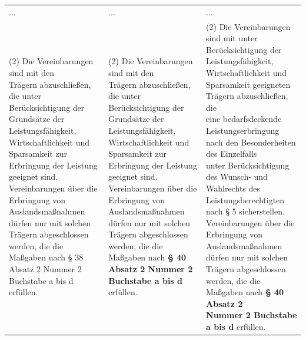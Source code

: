 \documentclass[10pt,a4paper,landscape]{article}
\begin{document}
\begin{longtable}{|L{8.2cm}|L{8.2cm}|L{8.2cm}|}
\hhline{|---|}
... & ... & ... \\
\hhline{|---|}
(2) Die Vereinbarungen sind mit \textcolor{diffred}{den  \newline Trägern abzuschließen, die} unter  \newline Berücksichtigung \textcolor{diffred}{der Grundsätze} der  \newline Leistungsfähigkeit, Wirtschaftlichkeit und  \newline Sparsamkeit \textcolor{diffred}{zur Erbringung der Leistung  \newline geeignet sind.} Vereinbarungen über die  \newline Erbringung von Auslandsmaßnahmen  \newline dürfen nur mit solchen Trägern  \newline abgeschlossen werden, die die Maßgaben  \newline nach \S{} \textcolor{diffred}{38} Absatz 2 Nummer 2 Buchstabe  \newline a bis d erfüllen. & (2) Die Vereinbarungen sind mit \textcolor{diffred}{den  \newline Trägern abzuschließen, die} unter  \newline Berücksichtigung \textcolor{diffred}{der Grundsätze} der  \newline Leistungsfähigkeit, Wirtschaftlichkeit und  \newline Sparsamkeit \textcolor{diffred}{zur Erbringung der Leistung  \newline geeignet sind.} Vereinbarungen über die  \newline Erbringung von Auslandsmaßnahmen  \newline dürfen nur mit solchen Trägern  \newline abgeschlossen werden, die die Maßgaben  \newline nach \textbf{\S{} 40 Absatz 2 Nummer 2  \newline Buchstabe a bis d} erfüllen. & (2) Die Vereinbarungen sind mit unter  \newline Berücksichtigung der Leistungsfähigkeit,  \newline Wirtschaftlichkeit und Sparsamkeit  \newline \textcolor{diffgreen}{geeigneten Trägern abzuschließen, die  \newline eine bedarfsdeckende Leistungserbringung  \newline nach den Besonderheiten des Einzelfalls  \newline unter Berücksichtigung des Wunsch- und  \newline Wahlrechts des Leistungsberechtigten  \newline nach \S{} 5 sicherstellen.} Vereinbarungen  \newline über die Erbringung von  \newline Auslandsmaßnahmen dürfen nur mit  \newline solchen Trägern abgeschlossen werden,  \newline die die Maßgaben nach \textbf{\S{} 40 Absatz 2  \newline Nummer 2 Buchstabe a bis d} erfüllen. \\

\end{longtable}
\end{document}
